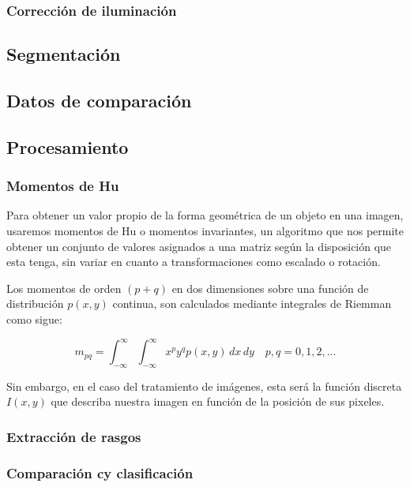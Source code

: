 \documentclass[letter]{article}
\begin{document}
\subsubsection{Corrección de iluminación}
\label{sec:org825a22b}

\subsection{Segmentación}
\label{sec:org6bd4302}

\subsection{Datos de comparación}
\label{sec:org30c838c}

\subsection{Procesamiento}
\label{sec:orgbbadae2}
\subsubsection{Momentos de Hu}
\label{sec:org2aee8f0}
Para obtener un valor propio de la forma geométrica de un objeto en una imagen,
usaremos momentos de Hu o momentos invariantes, un algoritmo que nos permite
obtener un conjunto de valores asignados a una matriz según la disposición que
esta tenga, sin variar en cuanto a transformaciones como escalado o rotación.

Los momentos de orden \((p+q)\) en dos dimensiones sobre una función de
distribución \(p(x, y)\) continua, son calculados mediante integrales de Riemman
como sigue:

$$
m_{pq} =  \int_{-\infty}^{\infty} \int_{-\infty}^{\infty} x^p y^q p(x, y)\,dx\,dy \quad p, q = 0, 1, 2, ...
$$

Sin embargo, en el caso del tratamiento de imágenes, esta será la función
discreta \(I(x, y)\) que describa nuestra imagen en función de la posición de sus
pixeles.

\subsubsection{Extracción de rasgos}
\label{sec:org71c8ac6}
\subsubsection{Comparación cy clasificación}
\label{sec:org1ea058c}
\end{document}
